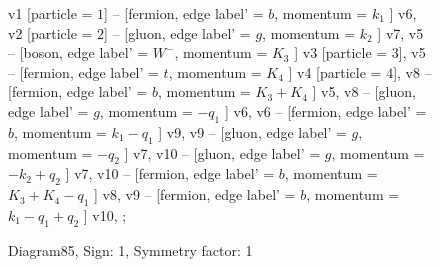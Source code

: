 \documentclass{revtex4}
\begin{document}
\begin{figure}[!htb]
\begin{center}
{    %
v1 [particle = \(1\)] -- [fermion, edge label' = \(b\), momentum = \(k_{1}\) ] v6, 
v2 [particle = \(2\)] -- [gluon, edge label' = \(g\), momentum = \(k_{2}\) ] v7, 
v5 -- [boson, edge label' = \(W^{-}\), momentum = \(K_{3}\) ] v3 [particle = \(3\)], 
v5 -- [fermion, edge label' = \(t\), momentum = \(K_{4}\) ] v4 [particle = \(4\)], 
v8 -- [fermion, edge label' = \(b\), momentum = \(K_{3} + K_{4}\) ] v5, 
v8 -- [gluon, edge label' = \(g\), momentum = \(-q_{1}\) ] v6, 
v6 -- [fermion, edge label' = \(b\), momentum = \(k_{1} - q_{1}\) ] v9, 
v9 -- [gluon, edge label' = \(g\), momentum = \(-q_{2}\) ] v7, 
v10 -- [gluon, edge label' = \(g\), momentum = \(-k_{2} + q_{2}\) ] v7, 
v10 -- [fermion, edge label' = \(b\), momentum = \(K_{3} + K_{4} - q_{1}\) ] v8, 
v9 -- [fermion, edge label' = \(b\), momentum = \(k_{1} - q_{1} + q_{2}\) ] v10, 
};
\end{center}
\caption{Diagram85, Sign: 1, Symmetry factor: 1}
\end{figure}
\newpage
\end{document}
